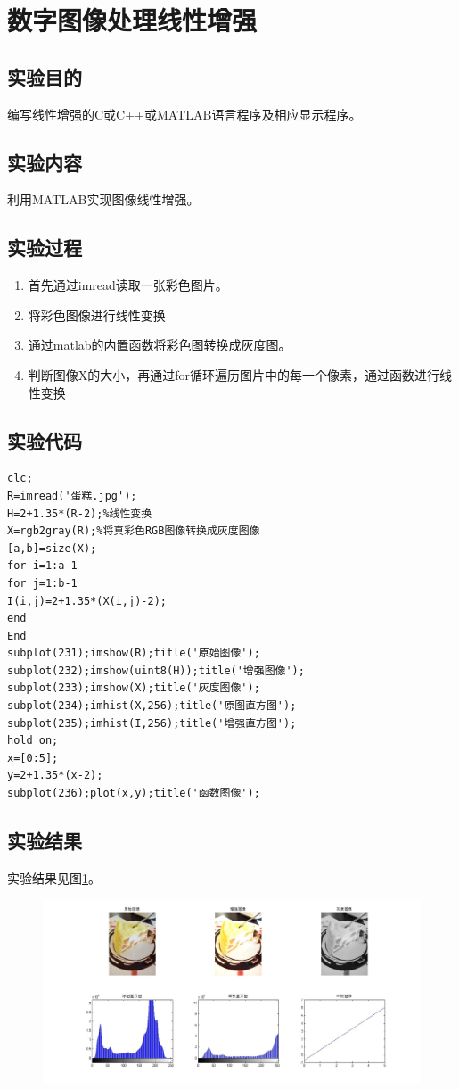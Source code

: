 \documentclass[12pt]{article}
\begin{document}
\setcounter{page}{1}
\section{数字图像处理线性增强}
\subsection{实验目的}
编写线性增强的C或C++或MATLAB语言程序及相应显示程序。
\subsection{实验内容}
利用MATLAB实现图像线性增强。
\subsection{实验过程}
\begin{enumerate}
  \item 首先通过imread读取一张彩色图片。
\item 将彩色图像进行线性变换
\item 通过matlab的内置函数将彩色图转换成灰度图。
\item 判断图像X的大小，再通过for循环遍历图片中的每一个像素，通过函数进行线性变换
\end{enumerate}
\subsection{实验代码}
\begin{lstlisting}
clc;
R=imread('蛋糕.jpg');
H=2+1.35*(R-2);%线性变换
X=rgb2gray(R);%将真彩色RGB图像转换成灰度图像
[a,b]=size(X);
for i=1:a-1
for j=1:b-1
I(i,j)=2+1.35*(X(i,j)-2);
end
End
subplot(231);imshow(R);title('原始图像');
subplot(232);imshow(uint8(H));title('增强图像');
subplot(233);imshow(X);title('灰度图像');
subplot(234);imhist(X,256);title('原图直方图');
subplot(235);imhist(I,256);title('增强直方图');
hold on;
x=[0:5];
y=2+1.35*(x-2);
subplot(236);plot(x,y);title('函数图像');
\end{lstlisting}
\subsection{实验结果}
实验结果见图\ref{shiyan1}。
\begin{figure}[h]
  \centering
  \includegraphics[width=\textwidth]{picture/xianxingzengq.jpg}
  \caption{}\label{shiyan1}
\end{figure}
\end{document}
